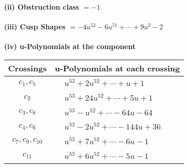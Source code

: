 \documentclass[1p]{elsarticle_modified}
\theoremstyle{definition}
\begin{document}
\flushleft \textbf{(ii) Obstruction class $= -1$}\\~\\
\flushleft \textbf{(iii) Cusp Shapes $= -4 u^{52}-6 u^{51}+\cdots+9 u^2-2$}\\~\\
\newpage\renewcommand{\arraystretch}{1}
\flushleft \textbf{(iv) u-Polynomials at the component}\newline \\
\begin{tabular}{m{50pt}|m{274pt}}
Crossings & \hspace{64pt}u-Polynomials at each crossing \\
\hline $$\begin{aligned}c_{1},c_{5}\end{aligned}$$&$\begin{aligned}
&u^{53}+2 u^{52}+\cdots+u+1
\end{aligned}$\\
\hline $$\begin{aligned}c_{2}\end{aligned}$$&$\begin{aligned}
&u^{53}+24 u^{52}+\cdots+5 u+1
\end{aligned}$\\
\hline $$\begin{aligned}c_{3},c_{8}\end{aligned}$$&$\begin{aligned}
&u^{53}- u^{52}+\cdots-64 u-64
\end{aligned}$\\
\hline $$\begin{aligned}c_{4},c_{6}\end{aligned}$$&$\begin{aligned}
&u^{53}-2 u^{52}+\cdots-144 u+36
\end{aligned}$\\
\hline $$\begin{aligned}c_{7},c_{9},c_{10}\end{aligned}$$&$\begin{aligned}
&u^{53}+7 u^{52}+\cdots-6 u-1
\end{aligned}$\\
\hline $$\begin{aligned}c_{11}\end{aligned}$$&$\begin{aligned}
&u^{53}+6 u^{52}+\cdots-5 u-1
\end{aligned}$\\
\hline
\end{tabular}\\~\\
\end{document}
